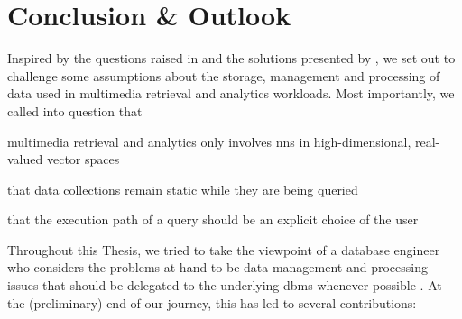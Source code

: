 \chapter{Conclusion \& Outlook}
\label{chapter:conclusion}

Inspired by the questions raised in \cite{Jonsson:2016Ten} and the solutions presented by \cite{Giangreco:2018Database}, we set out to challenge some assumptions about the storage, management and processing of data used in multimedia retrieval and analytics workloads. Most importantly, we called into question that 
\begin{enumerate*}[label=(\roman*), itemjoin={{, }}, itemjoin*={{, and }}, after={{.}}]
    \item multimedia retrieval and analytics only involves \acrshort{nns} in high-dimensional, real-valued vector spaces
    \item that data collections remain static while they are being queried
    \item that  the execution path of a query should be an explicit choice of the user
\end{enumerate*} 
Throughout this Thesis, we tried to take the viewpoint of a database engineer who considers the problems at hand to be data management and processing issues that should be delegated to the underlying \acrshort{dbms} whenever possible \cite{Ferro:2014Bridging,Amsaleg:2014Database}. At the (preliminary) end of our journey, this has led to several contributions:

